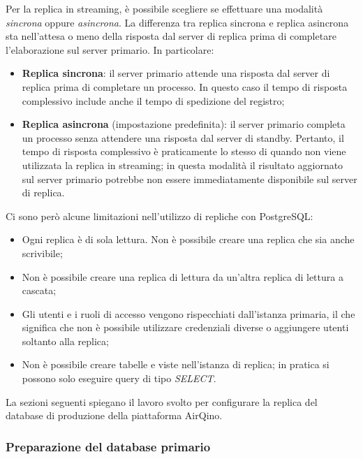 Per la replica in streaming, è possibile scegliere se effettuare una modalità \textit{sincrona} oppure \textit{asincrona}. La differenza tra replica sincrona e replica asincrona sta nell'attesa o meno della risposta dal server di replica prima di completare l'elaborazione sul server primario. In particolare:
\begin{itemize}
  \item \textbf{Replica sincrona}: il server primario attende una risposta dal server di replica prima di completare un processo. In questo caso il tempo di risposta complessivo include anche il tempo di spedizione del registro;
  \item \textbf{Replica asincrona} (impostazione predefinita): il server primario completa un processo senza attendere una risposta dal server di standby. Pertanto, il tempo di risposta complessivo è praticamente lo stesso di quando non viene utilizzata la replica in streaming; in questa modalità il risultato aggiornato sul server primario potrebbe non essere immediatamente disponibile sul server di replica. \cite{streaming_replication}
\end{itemize}

Ci sono però alcune limitazioni nell'utilizzo di repliche con PostgreSQL:
\begin{itemize}
  \item Ogni replica è di sola lettura. Non è possibile creare una replica che sia anche scrivibile;
  \item Non è possibile creare una replica di lettura da un'altra replica di lettura a cascata;
  \item Gli utenti e i ruoli di accesso vengono rispecchiati dall'istanza primaria, il che significa che non è possibile utilizzare credenziali diverse o aggiungere utenti soltanto alla replica;
  \item Non è possibile creare tabelle e viste nell'istanza di replica; in pratica si possono solo eseguire query di tipo \textit{SELECT}.
\end{itemize}

La sezioni seguenti spiegano il lavoro svolto per configurare la replica del database di produzione della piattaforma AirQino.

\subsubsection{Preparazione del database primario}

